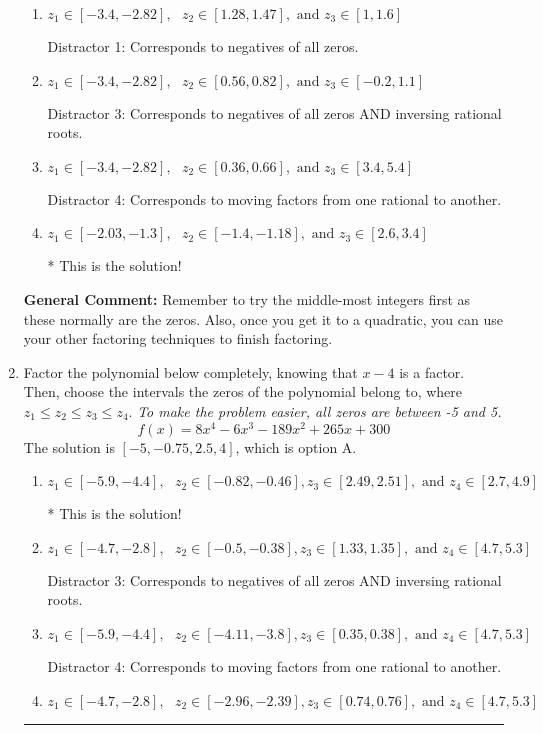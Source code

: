\documentclass{extbook}[14pt]
\newcommand{\litem}[1]{\item #1

\rule{\textwidth}{0.4pt}}
\begin{document}
\begin{enumerate}
{\begin{enumerate}[label=\Alph*.]
 Distractor 2: Corresponds to inversing rational roots.
\item \( z_1 \in [-3.4, -2.82], \text{   }  z_2 \in [1.28, 1.47], \text{   and   } z_3 \in [1, 1.6] \)

 Distractor 1: Corresponds to negatives of all zeros.
\item \( z_1 \in [-3.4, -2.82], \text{   }  z_2 \in [0.56, 0.82], \text{   and   } z_3 \in [-0.2, 1.1] \)

 Distractor 3: Corresponds to negatives of all zeros AND inversing rational roots.
\item \( z_1 \in [-3.4, -2.82], \text{   }  z_2 \in [0.36, 0.66], \text{   and   } z_3 \in [3.4, 5.4] \)

 Distractor 4: Corresponds to moving factors from one rational to another.
\item \( z_1 \in [-2.03, -1.3], \text{   }  z_2 \in [-1.4, -1.18], \text{   and   } z_3 \in [2.6, 3.4] \)

* This is the solution!
\end{enumerate}

\textbf{General Comment:} Remember to try the middle-most integers first as these normally are the zeros. Also, once you get it to a quadratic, you can use your other factoring techniques to finish factoring.
}
\litem{
Factor the polynomial below completely, knowing that $x -4$ is a factor. Then, choose the intervals the zeros of the polynomial belong to, where $z_1 \leq z_2 \leq z_3 \leq z_4$. \textit{To make the problem easier, all zeros are between -5 and 5.}
\[ f(x) = 8x^{4} -6 x^{3} -189 x^{2} +265 x + 300 \]The solution is \( [-5, -0.75, 2.5, 4] \), which is option A.\begin{enumerate}[label=\Alph*.]
\item \( z_1 \in [-5.9, -4.4], \text{   }  z_2 \in [-0.82, -0.46], z_3 \in [2.49, 2.51], \text{   and   } z_4 \in [2.7, 4.9] \)

* This is the solution!
\item \( z_1 \in [-4.7, -2.8], \text{   }  z_2 \in [-0.5, -0.38], z_3 \in [1.33, 1.35], \text{   and   } z_4 \in [4.7, 5.3] \)

 Distractor 3: Corresponds to negatives of all zeros AND inversing rational roots.
\item \( z_1 \in [-5.9, -4.4], \text{   }  z_2 \in [-4.11, -3.8], z_3 \in [0.35, 0.38], \text{   and   } z_4 \in [4.7, 5.3] \)

 Distractor 4: Corresponds to moving factors from one rational to another.
\item \( z_1 \in [-4.7, -2.8], \text{   }  z_2 \in [-2.96, -2.39], z_3 \in [0.74, 0.76], \text{   and   } z_4 \in [4.7, 5.3] \)


\end{enumerate}}
\end{enumerate}
\end{document}
